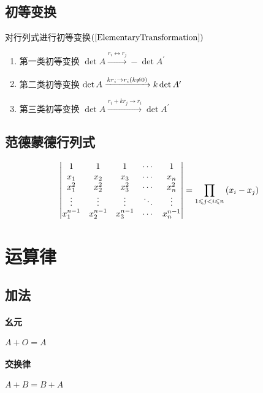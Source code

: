 \documentclass{article}
\begin{document}
\subsection{初等变换}

对行列式进行初等变换$\left(\ref{ElementaryTransformation}\right)$

\begin{enumerate}
    \item 第一类初等变换
          $\det A\xrightarrow{r_i\leftrightarrow r_j}-\det A^\prime$
    \item 第二类初等变换
          $\det A\xrightarrow{kr_i\rightarrow r_i\left(k\neq0\right)}k\det A^\prime$
    \item 第三类初等变换
          $\det A\xrightarrow{r_i+kr_j\rightarrow r_i}\det A^\prime$
\end{enumerate}

\subsection{范德蒙德行列式}

\[\begin{vmatrix}
        1         & 1         & 1         & \cdots & 1         \\
        x_1       & x_2       & x_3       & \cdots & x_n       \\
        x_1^2     & x_2^2     & x_3^2     & \cdots & x_n^2     \\
        \vdots    & \vdots    & \vdots    & \ddots & \vdots    \\
        x_1^{n-1} & x_2^{n-1} & x_3^{n-1} & \cdots & x_n^{n-1} \\
    \end{vmatrix}
    =\prod_{1\leqslant j<i\leqslant n}\left(x_i-x_j\right)\]

\section{运算律}

\subsection{加法}

\paragraph{幺元}$A+O=A$

\paragraph{交换律}$A+B=B+A$
\end{document}

